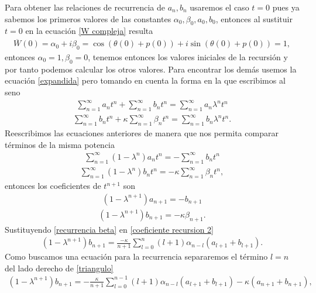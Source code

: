 Para obtener las relaciones de recurrencia de $a_{n},b_{n}$ usaremos el caso $t=0$ pues ya sabemos los primeros valores de las constantes $\alpha_{0}, \beta_{0}, a_{0}, b_{0}$, entonces al sustituir $t=0$ en la ecuación \ref{W compleja} resulta
\begin{eqnarray}
\overline{W}(0)=\alpha_{0}+i\beta_{0}=\cos(\theta(0)+p(0))+i\sin(\theta(0)+p(0))=1,
\end{eqnarray}
entonces $\alpha_{0}=1,\beta_{0}=0$, tenemos entonces los valores iniciales de la recursión y por tanto podemos calcular los otros valores. Para encontrar los demás usemos la ecuación \ref{expandida} pero tomando en cuenta la forma en la que escribimos al seno
\begin{eqnarray}
\sum_{n=1}^{\infty}a_{n}t^{n}+\sum_{n=1}^{\infty}b_{n}t^{n}=\sum_{n=1}^{\infty}a_{n}\lambda^{n}t^{n}
\end{eqnarray}
\begin{eqnarray}
\sum_{n=1}^{\infty}b_{n}t^{n}+\kappa\sum_{n=1}^{\infty}\beta_{n}t^{n}=\sum_{n=1}^{\infty}b_{n}
\lambda^{n}t^{n}.
\end{eqnarray}
Reescribimos las ecuaciones anteriores de manera que nos permita comparar términos de la misma potencia
\begin{eqnarray}
\sum_{n=1}^{\infty}(1-\lambda^{n})a_{n}t^{n}=-\sum_{n=1}^{\infty}b_{n}t^{n}
\end{eqnarray}
\begin{eqnarray}
\sum_{n=1}^{\infty}(1-\lambda^{n})b_{n}t^{n}=-\kappa\sum_{n=1}^{\infty}\beta_{n}t^{n},
\end{eqnarray}
entonces los coeficientes de $t^{n+1}$ son
\begin{eqnarray}
(1-\lambda^{n+1})a_{n+1}=-b_{n+1}
\label{coeficiente recursion 1}
\end{eqnarray}
\begin{eqnarray}
(1-\lambda^{n+1})b_{n+1}=-\kappa\beta_{n+1}.
\label{coeficiente recursion 2}
\end{eqnarray}
Sustituyendo \ref{recurrencia beta} en  \ref{coeficiente recursion 2}
\begin{eqnarray}
(1-\lambda^{n+1})b_{n+1}=\frac{-\kappa}{n+1}\sum_{l=0}^{n}(l+1)\alpha_{n-l}(a_{l+1}+b_{l+1}).
\label{triangulo}
\end{eqnarray}
Como buscamos una ecuación para la recurrencia separaremos el término $l=n$ del lado derecho de \ref{triangulo}
\begin{eqnarray}
(1-\lambda^{n+1})b_{n+1}=-\frac{\kappa}{n+1}\sum_{l=0}^{n-1}(l+1)\alpha_{n-l}(a_{l+1}+b_{l+1})-\kappa(a_{n+1}+b_{n+1}),
\label{triangulo1}
\end{eqnarray}
